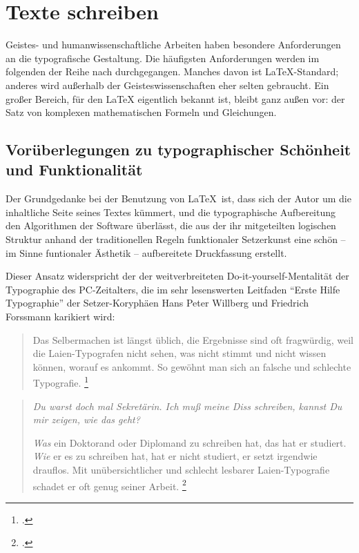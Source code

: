 
\chapter{Texte schreiben}

Geistes- und humanwissenschaftliche Arbeiten haben besondere Anforderungen an die typografische
Gestaltung. 
Die häufigsten Anforderungen werden im folgenden der Reihe nach durchgegangen.
Manches davon ist \LaTeX-Standard; anderes wird außerhalb der Geisteswissenschaften eher
selten gebraucht.
Ein großer Bereich, für den \LaTeX{} eigentlich bekannt ist, bleibt ganz außen vor:
der Satz von komplexen mathematischen Formeln und Gleichungen.


\section{Vorüberlegungen zu typographischer Schönheit und Funktionalität}


Der Grundgedanke bei der Benutzung von \LaTeX\ ist, dass sich der Autor um die inhaltliche Seite seines
Textes kümmert, und die typographische Aufbereitung den Algorithmen der Software überlässt, 
die aus der ihr mitgeteilten logischen Struktur anhand der traditionellen Regeln funktionaler Setzerkunst 
eine schön -- im Sinne funtionaler Ästhetik -- aufbereitete Druckfassung erstellt.

Dieser Ansatz widerspricht der der weitverbreiteten Do-it-yourself-Mentalität der Typographie des
PC-Zeitalters, die im sehr lesenswerten Leitfaden \enquote{Erste Hilfe Typographie} der Setzer-Koryphäen
Hans Peter Willberg und Friedrich Forssmann karikiert wird:

\begin{quote}
 Das Selbermachen ist längst üblich, die Ergebnisse sind oft fragwürdig,
 weil die Laien-Typografen nicht sehen, was nicht stimmt und nicht wissen
 können, worauf es ankommt.
 So gewöhnt man sich an falsche und schlechte Typografie.
 \footcite[9]{erste_hilfe}
 \end{quote}
 
\begin{quotation}
 \emph{Du warst doch mal Sekretärin.
 Ich muß meine Diss schreiben, kannst Du mir zeigen, wie das geht?}
 
 \emph{Was} ein Doktorand oder Diplomand zu schreiben hat, das hat er studiert.
 \emph{Wie} er es zu schreiben hat, hat er nicht studiert, er setzt irgendwie drauflos.
 Mit unübersichtlicher und schlecht lesbarer Laien-Typografie schadet er oft genug seiner Arbeit.
 \footcite[86]{erste_hilfe}
\end{quotation}

